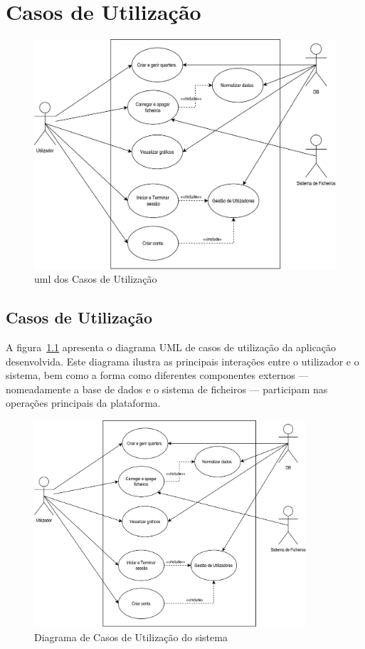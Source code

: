 \chapter{Casos de Utilização}
\label{ch:casosUtilizacao}

\begin{figure}[h]
\centering
\includegraphics[width=14cm]{./img/usecase_uml}
\caption{\gls{uml} dos Casos de Utilização}
\label{fig:umlCasosUtilizacao}
\end{figure}

\section{Casos de Utilização}

A figura~\ref{fig:umlCasosUtilizacao} apresenta o diagrama UML de casos de utilização da aplicação desenvolvida. Este diagrama ilustra as principais interações entre o utilizador e o sistema, bem como a forma como diferentes componentes externos — nomeadamente a base de dados e o sistema de ficheiros — participam nas operações principais da plataforma.

\begin{figure}[H]
    \centering
    \includegraphics[width=0.9\textwidth]{img/usecase_uml.png}
    \caption{Diagrama de Casos de Utilização do sistema}
    \label{fig:usecase}
\end{figure}

